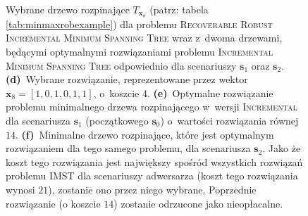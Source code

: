 \begin{figure}[!htbp]
\begin{subfigure}[b]{0.3\textwidth}
		\caption{}
		\label{fig:robincrexample:f}
	\end{subfigure}
	\hfill\null
	\caption{
		Wybrane drzewo rozpinające $T_{\textbf{x}_{8}}$ (patrz: tabela \ref{tab:minmaxrobexample}) dla problemu \textsc{Recoverable Robust Incremental Minimum Spanning Tree} wraz z~dwoma drzewami, będącymi optymalnymi rozwiązaniami problemu \textsc{Incremental Minimum Spanning Tree} odpowiednio dla scenariuszy $\textbf{s}_{1}$ oraz $\textbf{s}_{2}$.
		\textbf{(d)}~Wybrane rozwiązanie, reprezentowane przez wektor $\textbf{x}_{8} = \left[ 1, 0, 1, 0, 1, 1 \right]$, o~koszcie $4$.
		\textbf{(e)}~Optymalne rozwiązanie problemu minimalnego drzewa rozpinającego w~wersji \textsc{Incremental} dla scenariusza $\textbf{s}_{1}$ (początkowego $\textbf{s}_{0}$) o~wartości rozwiązania równej $14$.
		\textbf{(f)}~Minimalne drzewo rozpinające, które jest optymalnym rozwiązaniem dla tego samego problemu, dla scenariusza $\textbf{s}_{2}$.
		Jako że koszt tego rozwiązania jest największy spośród wszystkich rozwiązań problemu \textsc{IMST} dla scenariuszy adwersarza (koszt tego rozwiązania wynosi $21$), zostanie ono przez niego wybrane.
		Poprzednie rozwiązanie (o koszcie $14$) zostanie odrzucone jako nieopłacalne.
	}
	\label{fig:robincrexample}
\end{figure}

